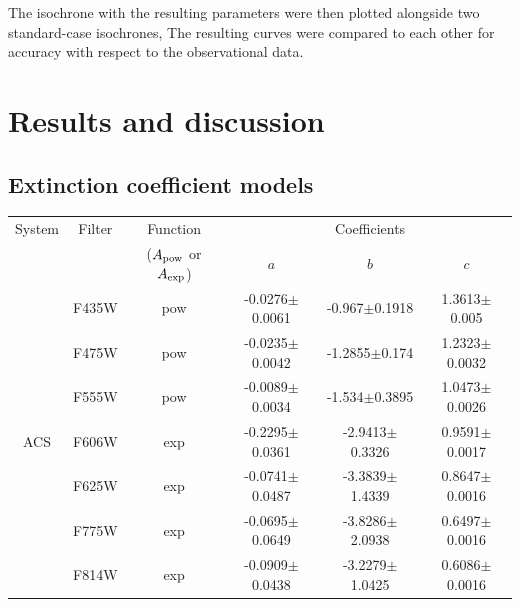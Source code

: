 \documentclass[12pt, a4paper]{report}
\begin{document}
The isochrone with the resulting parameters were then plotted alongside two standard-case isochrones, The resulting curves were compared to each other for accuracy with respect to the observational data.

\chapter{Results and discussion}
\section{Extinction coefficient models} \label{coef_models}

\begin{table}
\begin{center}
\begin{tabular}{cccccc}
\hline
System & Filter &  Function & & Coefficients & \\
 & & ($A_{\textnormal{pow}}$ or $A_{\textnormal{exp}}$) & $a$ & $b$ & $c$ \\
\hline

& F435W & pow & -0.0276$\pm$0.0061 & -0.967$\pm$0.1918 & 1.3613$\pm$0.005 \\
& F475W & pow & -0.0235$\pm$0.0042 & -1.2855$\pm$0.174 & 1.2323$\pm$0.0032 \\
& F555W & pow & -0.0089$\pm$0.0034 & -1.534$\pm$0.3895 & 1.0473$\pm$0.0026 \\
ACS & F606W & exp & -0.2295$\pm$0.0361 & -2.9413$\pm$0.3326 & 0.9591$\pm$0.0017 \\
& F625W & exp & -0.0741$\pm$0.0487 & -3.3839$\pm$1.4339 & 0.8647$\pm$0.0016 \\
& F775W & exp & -0.0695$\pm$0.0649 & -3.8286$\pm$2.0938 & 0.6497$\pm$0.0016 \\
& F814W & exp & -0.0909$\pm$0.0438 & -3.2279$\pm$1.0425 & 0.6086$\pm$0.0016 \\ \hline



\end{tabular}
\end{center}
\end{table}
\end{document}
